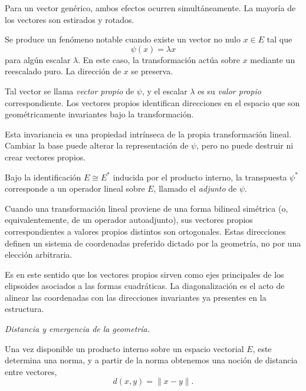 \medskip

Para un vector genérico, ambos efectos ocurren simultáneamente.
La mayoría de los vectores son estirados y rotados.

\medskip

Se produce un fenómeno notable cuando existe un vector no nulo $x \in E$
tal que
\[
\psi(x) = \lambda x
\]
para algún escalar $\lambda$.
En este caso, la transformación actúa sobre $x$ mediante un reescalado puro.
La dirección de $x$ se preserva.

\medskip

Tal vector se llama \emph{vector propio} de $\psi$, y el escalar $\lambda$
es su \emph{valor propio} correspondiente.
Los vectores propios identifican direcciones en el espacio que son
geométricamente invariantes bajo la transformación.

\medskip

Esta invariancia es una propiedad intrínseca de la propia transformación lineal.
Cambiar la base puede alterar la representación de $\psi$, pero no puede
destruir ni crear vectores propios.

\medskip

Bajo la identificación $E \cong E^*$ inducida por el producto interno, la
transpuesta $\psi^*$ corresponde a un operador lineal sobre $E$, llamado
el \emph{adjunto} de $\psi$.

\medskip

Cuando una transformación lineal proviene de una forma bilineal simétrica (o,
equivalentemente, de un operador autoadjunto), sus vectores propios
correspondientes a valores propios distintos son ortogonales.
Estas direcciones definen un sistema de coordenadas preferido dictado por la
geometría, no por una elección arbitraria.

\medskip

Es en este sentido que los vectores propios sirven como ejes principales de
los elipsoides asociados a las formas cuadráticas.
La diagonalización es el acto de alinear las coordenadas con las direcciones
invariantes ya presentes en la estructura.

\medskip


\textit{Distancia y emergencia de la geometría.}

Una vez disponible un producto interno sobre un espacio vectorial $E$, este
determina una norma, y a partir de la norma obtenemos una noción de distancia
entre vectores,
\[
d(x,y)=\|x-y\|.
\]

